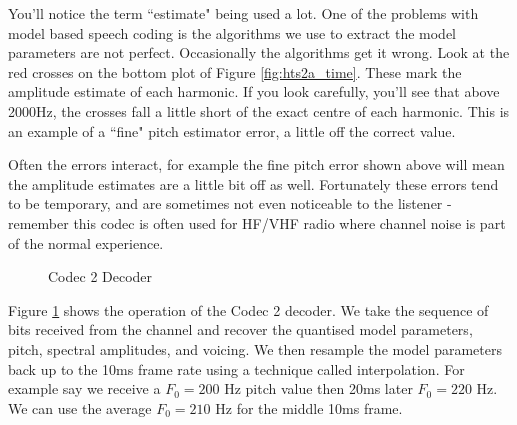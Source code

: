 \documentclass{article}
\begin{document}
{You'll notice the term ``estimate" being used a lot.  One of the problems with model based speech coding is the algorithms we use to extract the model parameters are not perfect.  Occasionally the algorithms get it wrong.  Look at the red crosses on the bottom plot of Figure \ref{fig:hts2a_time}.  These mark the amplitude estimate of each harmonic.  If you look carefully, you'll see that above 2000Hz, the crosses fall a little short of the exact centre of each harmonic.  This is an example of a ``fine" pitch estimator error, a little off the correct value.

Often the errors interact, for example the fine pitch error shown above will mean the amplitude estimates are a little bit off as well. Fortunately these errors tend to be temporary, and are sometimes not even noticeable to the listener - remember this codec is often used for HF/VHF radio where channel noise is part of the normal experience.
 
\begin{figure}[h]
\caption{Codec 2 Decoder}
\label{fig:codec2_decoder}
\begin{center}
\end{center}
\end{figure}

Figure \ref{fig:codec2_decoder} shows the operation of the Codec 2 decoder.  We take the sequence of bits received from the channel and recover the quantised model parameters, pitch, spectral amplitudes, and voicing.  We then resample the model parameters back up to the 10ms frame rate using a technique called interpolation.  For example say we receive a $F_0=200$ Hz pitch value then 20ms later $F_0=220$ Hz.  We can use the average $F_0=210$ Hz for the middle 10ms frame.

}
\end{document}
